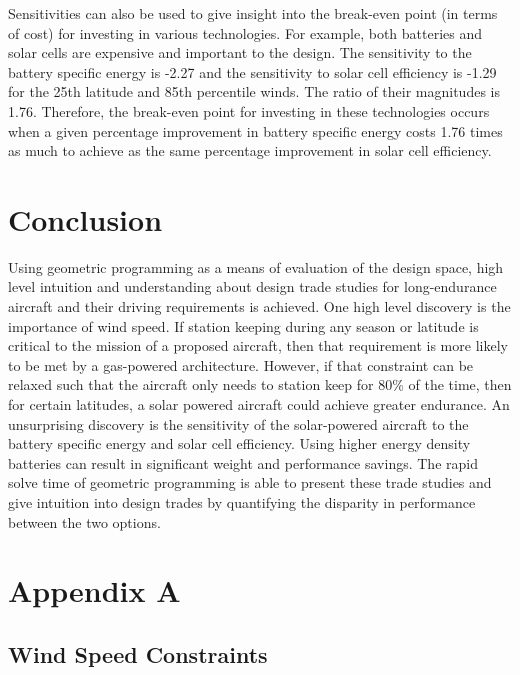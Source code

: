 Sensitivities can also be used to give insight into the break-even point (in terms of cost) for investing in various technologies.  
For example, both batteries and solar cells are expensive and important to the design.  
The sensitivity to the battery specific energy is -2.27 and the sensitivity to solar cell efficiency is -1.29 for the 25th latitude and 85th percentile winds. 
The ratio of their magnitudes is 1.76.  
Therefore, the break-even point for investing in these technologies occurs when a given percentage improvement in battery specific energy costs 1.76 times as much to achieve as the same percentage improvement in solar cell efficiency. 





\section{Conclusion}

Using geometric programming as a means of evaluation of the design space, high level intuition and understanding about design trade studies for long-endurance aircraft and their driving requirements is achieved.  
One high level discovery is the importance of wind speed.  
If station keeping during any season or latitude is critical to the mission of a proposed aircraft, then that requirement is more likely to be met by a gas-powered architecture.
However, if that constraint can be relaxed such that the aircraft only needs to station keep for 80\% of the time, then for certain latitudes, a solar powered aircraft could achieve greater endurance.
An unsurprising discovery is the sensitivity of the solar-powered aircraft to the battery specific energy and solar cell efficiency.  Using higher energy density batteries can result in significant weight and performance savings.  
The rapid solve time of geometric programming is able to present these trade studies and give intuition into design trades by quantifying the disparity in performance between the two options.





\section*{Appendix A}

\subsection{Wind Speed Constraints}

